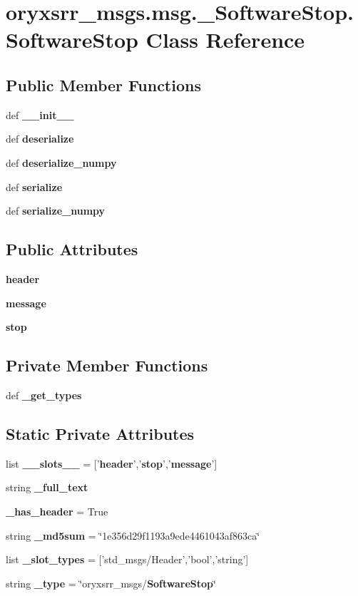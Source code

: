 \section{oryxsrr\-\_\-msgs.\-msg.\-\_\-\-Software\-Stop.\-Software\-Stop \-Class \-Reference}
\label{classoryxsrr__msgs_1_1msg_1_1__SoftwareStop_1_1SoftwareStop}
\subsection*{\-Public \-Member \-Functions}
\begin{DoxyCompactItemize}
\item 
def {\bf \-\_\-\-\_\-init\-\_\-\-\_\-}
\item 
def {\bf deserialize}
\item 
def {\bf deserialize\-\_\-numpy}
\item 
def {\bf serialize}
\item 
def {\bf serialize\-\_\-numpy}
\end{DoxyCompactItemize}
\subsection*{\-Public \-Attributes}
\begin{DoxyCompactItemize}
\item 
{\bf header}
\item 
{\bf message}
\item 
{\bf stop}
\end{DoxyCompactItemize}
\subsection*{\-Private \-Member \-Functions}
\begin{DoxyCompactItemize}
\item 
def {\bf \-\_\-get\-\_\-types}
\end{DoxyCompactItemize}
\subsection*{\-Static \-Private \-Attributes}
\begin{DoxyCompactItemize}
\item 
list {\bf \-\_\-\-\_\-slots\-\_\-\-\_\-} = ['{\bf header}','{\bf stop}','{\bf message}']
\item 
string {\bf \-\_\-full\-\_\-text}
\item 
{\bf \-\_\-has\-\_\-header} = \-True
\item 
string {\bf \-\_\-md5sum} = \char`\"{}1e356d29f1193a9ede4461043af863ca\char`\"{}
\item 
list {\bf \-\_\-slot\-\_\-types} = ['std\-\_\-msgs/\-Header','bool','string']
\item 
string {\bf \-\_\-type} = \char`\"{}oryxsrr\-\_\-msgs/{\bf \-Software\-Stop}\char`\"{}
\end{DoxyCompactItemize}


